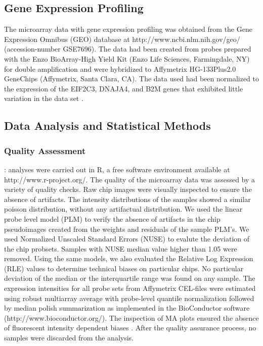 \documentclass[9pt,twocolumn,twoside]{gsajnl}
\begin{document}
\subsection*{Gene Expression Profiling}

The microarray data with gene expression profiling was obtained from the Gene Expression Omnibus (GEO) database at http://www.ncbi.nlm.nih.gov/geo/ (accession-number GSE7696). The data had been created from probes prepared with the Enzo BioArray-High Yield Kit (Enzo Life Sciences, Farmingdale, NY) for double amplification and were hybridized to Affymetrix HG-133Plus2.0 GeneChips (Affymetrix, Santa Clara, CA). The data used had been normalized to the expression of the EIF2C3, DNAJA4, and B2M genes that exhibited little variation in the data set \citep{Murat2008}.

\subsection*{Data Analysis and Statistical Methods}

\subsubsection*{Quality Assessment}: analyses were carried out in R, a free software environment available at http://www.r-project.org/. The quality of the microarray data was assessed by a variety of quality checks. Raw chip images were visually inspected to ensure the absence of  artifacts. The intensity distributions of the samples showed a similar poisson distribution, without any artifactual distribution. We used the linear probe level model (PLM) \citep{Bolstad2004, Brettschneider2007} to verify the absence of artifacts in the chip pseudoimages created from the weights and residuals of the sample PLM's. We used Normalized Unscaled Standard Errors (NUSE) \citep{Bolstad2004} to evalute the deviation of the chip probsets. Samples with NUSE median value higher than 1.05 were removed. Using the same models, we also evaluated the Relative Log Expression (RLE) values \citep{Bolstad2004, Brettschneider2007} to determine technical biases on particular chips. No particular deviation of the median or the interquartile range was found on any sample. The expression intensities for all probe sets from Affymetrix CEL-files were estimated using robust multiarray average  with probe-level quantile normalization followed by median polish summarization \citep{Irizarry2003} as implemented in the BioConductor software (http://www.bioconductor.org/). The inspection of MA plots ensured the absence of fluorescent intensity dependent biases \citep{Bolstad2004}. After the quality assurance process, no samples were discarded from the analysis.
\end{document}

